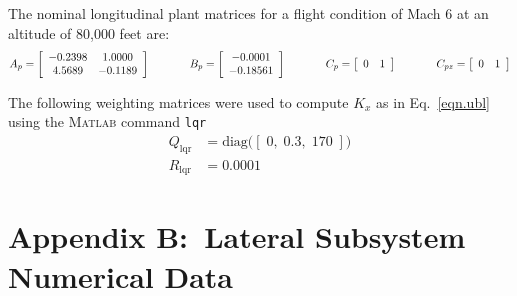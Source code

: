 \documentclass[]{../sty/JGCD}
\theoremstyle{examplestyle}
\begin{document}
  The nominal longitudinal plant matrices for a flight condition of Mach 6 at an altitude of 80,000 feet are:
  \begin{equation*}
    A_{p}=
    \left[
    \begin{array}{cccc}
      -0.2398 & 1.0000 \\
      4.5689 & -0.1189
    \end{array}\right]
    \hspace{0.5in}
    B_{p}=
    \left[
    \begin{array}{ccccc}
      -0.0001 \\
      -0.18561
    \end{array}\right]
    \hspace{0.5in}
    C_{p}=
    \left[
    \begin{array}{ccccc}
      0 & 1
    \end{array}\right]
    \hspace{0.5in}
    C_{pz}=
    \left[
    \begin{array}{ccccc}
      0 & 1
    \end{array}\right]
  \end{equation*}

  The following weighting matrices were used to compute $K_{x}$ as in Eq.\ \eqref{eqn.ubl} using the \textsc{Matlab} command \texttt{lqr}
  \begin{align*}
    Q_{\text{lqr}}&=\text{diag}\bigr(
    [\; 0, \; 0.3, \; 170 \; ]\bigr) \\
    R_{\text{lqr}}&=0.0001
  \end{align*}

  \section*{Appendix B:\ Lateral Subsystem Numerical Data}\label{sec.appendix_latr}
\end{document}
